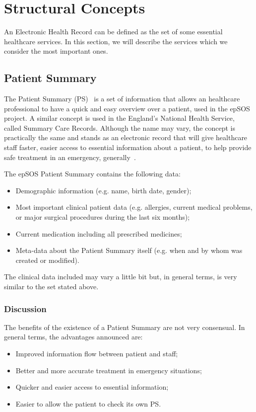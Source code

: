\section{Structural Concepts}

An Electronic Health Record can be defined as the set of some essential healthcare services. In this section, we will describe the services which we consider the most important ones.

\subsection{Patient Summary}

The Patient Summary (PS)~\citep{EPSOS_PS} is a set of information that allows an healthcare professional to have a quick and easy overview over a patient, used in the epSOS project. A similar concept is used in the England's National Health Service, called Summary Care Records. Although the name may vary, the concept is practically the same and stands as an electronic record that will give healthcare staff faster, easier access to essential information about a patient, to help provide safe treatment in an emergency, generally~\citep{Service2010}.

The epSOS Patient Summary contains the following data:
\begin{itemize}
\item Demographic information (e.g. name, birth date, gender);
\item Most important clinical patient data (e.g. allergies, current medical problems, or major surgical procedures during the last six months);
\item Current medication including all prescribed medicines;
\item Meta-data about the Patient Summary itself (e.g. when and by whom was created or modified).
\end{itemize}

The clinical data included may vary a little bit but, in general terms, is very similar to the set stated above.

\subsubsection{Discussion}

The benefits of the existence of a Patient Summary are not very consensual. In general terms, the advantages announced are:
\begin{itemize}
\item Improved information flow between patient and staff;
\item Better and more accurate treatment in emergency situations;
\item Quicker and easier access to essential information;
\item Easier to allow the patient to check its own PS.
\end{itemize}

